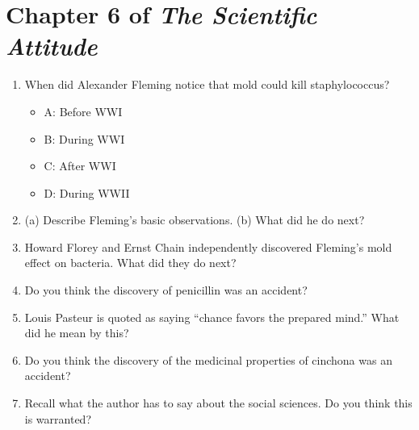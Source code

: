 \documentclass[12pt]{article}
\begin{document}
\maketitle
\small

\section{Chapter 6 of \textit{The Scientific Attitude}}

\begin{enumerate}
\item When did Alexander Fleming notice that mold could kill staphylococcus?
\begin{itemize}
\item A: Before WWI
\item B: During WWI
\item C: After WWI
\item D: During WWII
\end{itemize}
\item (a) Describe Fleming's basic observations. (b) What did he do next? \\ \vspace{1cm}
\item Howard Florey and Ernst Chain independently discovered Fleming's mold effect on bacteria.  What did they do next?  \\ \vspace{1cm}
\item Do you think the discovery of penicillin was an accident? \\ \vspace{1cm}
\item Louis Pasteur is quoted as saying ``chance favors the prepared mind.'' What did he mean by this? \\ \vspace{1cm}
\item Do you think the discovery of the medicinal properties of cinchona was an accident? \\ \vspace{1cm}
\item Recall what the author has to say about the social sciences.  Do you think this is warranted?
\end{enumerate}
\end{document}
